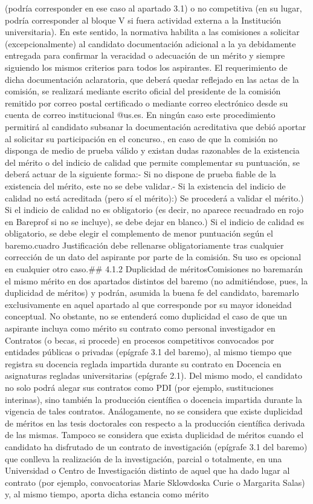 \documentclass{article}
\begin{document}
\begin{itemize}
{{{{{(podría corresponder en ese caso al apartado 3.1) o no competitiva (en su lugar, podría corresponder al bloque V si fuera actividad externa a la Institución universitaria). En este sentido, la normativa habilita a las comisiones a solicitar (excepcionalmente) al candidato documentación adicional a la ya debidamente entregada para confirmar la veracidad o adecuación de un mérito y siempre siguiendo los mismos criterios para todos los aspirantes. El requerimiento de dicha documentación aclaratoria, que deberá quedar reflejado en las actas de la comisión, se realizará mediante escrito oficial del presidente de la comisión remitido por correo postal certificado o mediante correo electrónico desde su cuenta de correo institucional @us.es. En ningún caso este procedimiento permitirá al candidato subsanar la documentación acreditativa que debió aportar al solicitar su participación en el concurso.\n\nFinalmente, en caso de que la comisión no disponga de medio de prueba válido y existan dudas razonables de la existencia del mérito o del indicio de calidad que permite complementar su puntuación, se deberá actuar de la siguiente forma:\n- Si no dispone de prueba fiable de la existencia del mérito, este no se debe validar.\n- Si la existencia del indicio de calidad no está acreditada (pero sí el mérito):\na) Se procederá a validar el mérito.\nb) Si el indicio de calidad no es obligatorio (es decir, no aparece recuadrado en rojo en Bareprof si no se incluye), se debe dejar en blanco.\nc) Si el indicio de calidad es obligatorio, se debe elegir el complemento de menor puntuación según el baremo.\n\nEl cuadro Justificación debe rellenarse obligatoriamente tras cualquier corrección de un dato del aspirante por parte de la comisión. Su uso es opcional en cualquier otro caso.\n\n## 4.1.2 Duplicidad de méritos\n\nLas Comisiones no baremarán el mismo mérito en dos apartados distintos del baremo (no admitiéndose, pues, la duplicidad de méritos) y podrán, asumida la buena fe del candidato, baremarlo exclusivamente en aquel apartado al que corresponde por su mayor idoneidad conceptual. No obstante, no se entenderá como duplicidad el caso de que un aspirante incluya como mérito su contrato como personal investigador en Contratos (o becas, si procede) en procesos competitivos convocados por entidades públicas o privadas (epígrafe 3.1 del baremo), al mismo tiempo que registra su docencia reglada impartida durante su contrato en Docencia en asignaturas regladas universitarias (epígrafe 2.1). Del mismo modo, el candidato no solo podrá alegar sus contratos como PDI (por ejemplo, sustituciones interinas), sino también la producción científica o docencia impartida durante la vigencia de tales contratos. Análogamente, no se considera que existe duplicidad de méritos en las tesis doctorales con respecto a la producción científica derivada de las mismas. Tampoco se considera que exista duplicidad de méritos cuando el candidato ha disfrutado de un contrato de investigación (epígrafe 3.1 del baremo) que conlleva la realización de la investigación, parcial o totalmente, en una Universidad o Centro de Investigación distinto de aquel que ha dado lugar al contrato (por ejemplo, convocatorias Marie Sklowdoska Curie o Margarita Salas) y, al mismo tiempo, aporta dicha estancia como mérito }}}}}
\end{itemize}
\end{document}
